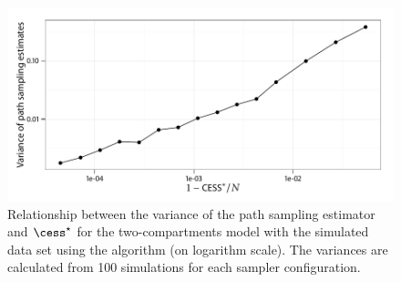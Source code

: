 \begin{figure}[t]
  \UseAltLinespread
  \includegraphics[width=\linewidth]{fig_src/CESS_Path_Var}
  \caption[Relations between the variance of the path sampling estimator and
  \protect\cess]
  {Relationship between the variance of the path sampling estimator and $\cess^\star$ for the two-compartments \pet model with the simulated data set using the \smc[2] algorithm (on logarithm scale). The variances are calculated from 100 simulations for each sampler configuration.}
  \label{fig:cess path var}
\end{figure}
